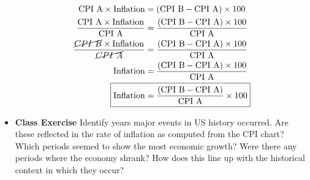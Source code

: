 \documentclass{article}
\begin{document}
\begin{itemize}
    \begin{align*}
        \mathrm{CPI\ A \times Inflation} &= \mathrm{(CPI\ B-CPI\ A)} \times 100\\
        \dfrac{\mathrm{CPI\ A \times Inflation}}{\mathrm{CPI\ A}} &= \dfrac{\mathrm{(CPI\ B-CPI\ A) \times 100}}{\mathrm{CPI\ A}}\\
        \dfrac{\mathrm{\cancel{CPI\ B} \times Inflation}}{\mathrm{\cancel{CPI\ A}}} &= \dfrac{\mathrm{(CPI\ B-CPI\ A) \times 100}}{\mathrm{CPI\ A}}\\
        \mathrm{Inflation} &= \dfrac{\mathrm{(CPI\ B-CPI\ A) \times 100}}{\mathrm{CPI\ A}}\\
        \Aboxed{\mathrm{Inflation} &= \dfrac{\mathrm{(CPI\ B-CPI\ A)}}{\mathrm{CPI\ A}}\times 100}
    \end{align*}
    \item {\bf Class Exercise} Identify years major events in US history occurred.  Are these reflected in the rate of inflation as computed from the CPI chart?  Which periods seemed to show the most economic growth? Were there any periods where the economy shrank? How does this line up with the historical context in which they occur?
\end{itemize}
\end{document}
